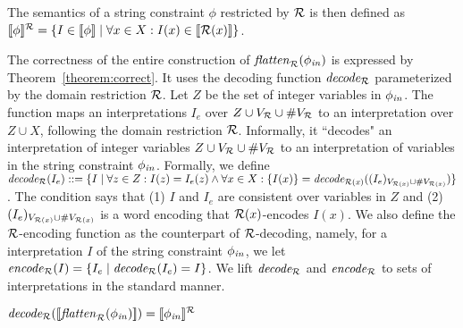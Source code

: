 \documentclass[sigplan,review,anonymous]{acmart}\settopmatter{printfolios=true,printccs=false,printacmref=false}
\begin{document}

The semantics of a string constraint $\phi$ restricted by $\mathcal{R}$ is then defined as 
$[\![\phi]\!]^{\mathcal{R}} = \{I\in[\![\phi]\!] \mid \forall x\in X:I(x)\in[\![\mathcal{R}(x)]\!]\}$.

The correctness of the entire construction of $\mathit{flatten}_{\mathcal{R}}(\phi_{\mathit{in}})$ is expressed by  Theorem~\ref{theorem:correct}. 
It uses the decoding function $\mathit{decode_{\mathcal{R}}}$ parameterized by the domain restriction $\mathcal{R}$. 
Let $Z$ be the set of integer variables in $\phi_{\mathit{in}}$.
The function maps an interpretations $I_e$ over $Z\cup V_{\mathcal{R}}\cup\#V_{\mathcal{R}}$
to an interpretation over $Z \cup X$, following the domain restriction $\mathcal{R}$. Informally, it ``decodes" an interpretation of integer variables $Z\cup V_{\mathcal{R}}\cup\#V_{\mathcal{R}}$ to an interpretation of variables in the string constraint $\phi_{\mathit{in}}$. Formally,
we define $\mathit{decode_{\mathcal{R}}} (I_e) ::= \{I \mid \forall z\in Z: I(z) = I_e(z) \wedge\forall x\in X: \{I(x)\} = \mathit{decode_{\mathcal{R}(x)}} ((I_e)_{V_{\mathcal{R}(x)}\cup \#V_{\mathcal{R}(x)}})\}$.
The condition says that (1) $I$ and $I_e$ are consistent over variables in $Z$ and (2) $(I_e)_{V_{\mathcal{R}(x)}\cup \#V_{\mathcal{R}(x)}}$ is a word encoding that $\mathcal{R}(x)$-encodes $I(x)$.
We also define the $\mathcal{R}$-encoding function as the counterpart of $\mathcal{R}$-decoding,  
%
namely, for a interpretation $I$ of the string constraint $\phi_{\mathit{in}}$,  
we let $\mathit{encode}_{\mathcal{R}} (I) =\{I_e\mid \mathit{decode_{\mathcal{R}}} (I_e) = I \}$.
We lift $\mathit{decode_{\mathcal{R}}}$ and $\mathit{encode}_{\mathcal{R}}$ to sets of interpretations in the standard manner.
\begin{theorem}\label{theorem:correct}
$\mathit{decode_{\mathcal{R}}} ([\![\mathit{flatten}_{\mathcal{R}}(\phi_{\mathit{in}})]\!]) = [\![\phi_{\mathit{in}}]\!]^{\mathcal{R}}$ 
\end{theorem}
\end{document}
